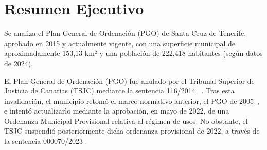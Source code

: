 \section{Resumen Ejecutivo}
Se analiza el Plan General de Ordenación (PGO) de Santa Cruz de Tenerife, aprobado en 2015 y actualmente vigente, con una superficie municipal de aproximadamente 153,13 km² y una población de 222.418 habitantes (según datos de 2024).

El Plan General de Ordenación (PGO) fue anulado por el Tribunal Superior de Justicia de Canarias (TSJC)
mediante la sentencia 116/2014~\cite{tsjc_116_2014}
. Tras esta invalidación, el municipio retomó el marco normativo anterior, el PGO de 2005~\cite{pgou_santacruz_2005},
e intentó actualizarlo mediante la aprobación, en mayo de 2022, de una Ordenanza Municipal Provisional relativa al régimen de usos. No obstante, el TSJC suspendió posteriormente dicha ordenanza provisional de 2022, a través de la sentencia 000070/2023 \cite{tsjc_070_2023}.










